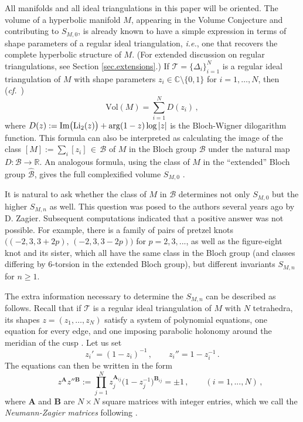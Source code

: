 \documentclass[12pt]{amsart}
\newcommand{\lbl}{\label}
\theoremstyle{definition}
\def\BR{\mathbb R}
\def\BC{\mathbb C}
\def\be{  \begin{equation} }
\def\ee{  \end{equation} }
\newcommand{\CT}{\mathcal{T}}
\newcommand{\Li}{{\rm Li}}
\newcommand{\ie}{\emph{i.e.}}
\newcommand{\cf}{\emph{cf.}}
\newcommand{\mb}{\mathbf}
\numberwithin{equation}{section}
\begin{document}
All manifolds and all ideal triangulations in this paper will be 
oriented. 
The volume of a hyperbolic manifold $M$, appearing in the Volume
Conjecture and contributing to $S_{M,0}$, is already known to have a simple 
expression in terms of shape parameters of a regular ideal 
triangulation, \ie, one that recovers the complete hyperbolic structure of 
$M$. (For extended discussion on regular triangulations, see Section \ref{sec.extensions}.)
If $\CT=\{\Delta_i\}_{i=1}^N$ is a regular ideal triangulation of $M$
with shape parameters 
$z_i \in \BC\setminus\{0,1\}$ for $i=1,\dots,N$, then (\cf\ \cite{DuS, NZ})
%
\be \mathrm{Vol}(M) 
= \sum_{i=1}^N D(z_i)\,,
\lbl{eq.Dz}
\ee
%
where $D(z) := \mathrm{Im}\big(\Li_2(z)\big)+\arg(1-z)\log|z|$ is the Bloch-Wigner dilogarithm function.
This formula can also be interpreted as calculating the image of the class 
$[M]:=\sum_i[z_i]\,\in\,\mathcal{B}$ of $M$ in the 
Bloch group $\mathcal{B}$ under the natural map $D:\mathcal{B} \to \BR$. 
An analogous formula, using the class of $M$ in the ``extended'' Bloch group 
$\widehat{\mathcal{B}}$, gives the full complexified volume $S_{M,0}$ 
\cite{Neumann-combi, N,GoZi, Zickert-rep}. 

It is natural to ask whether the class of $M$ in $\mathcal{B}$
determines not only $S_{M,0}$ but the higher $S_{M,n}$ as well. 
This question was posed to the authors several years ago by D. Zagier.
Subsequent computations \cite{GZ,Ga2} indicated that a positive answer
was not possible. For example, there is a family of pairs of pretzel knots 
$\big((-2,3,3+2p),\,(-2,3,3-2p)\big)$ for $p=2,3,...$, as well as the figure-eight knot and its sister, which all have the same class 
in the Bloch group (and classes differing by 6-torsion in the extended
Bloch group), but different invariants $S_{M,n}$ for $n \geq 1$. 

The extra information necessary to determine the $S_{M,n}$ can be described as follows.
Recall that if $\CT$ %
is a regular ideal triangulation of $M$ with $N$ tetrahedra, its shapes $z=(z_1,\dots,z_N)$ satisfy a system of 
polynomial equations, one equation for every 
edge, and one imposing 
parabolic holonomy around the meridian of the cusp \cite{Th, NZ}. Let us set
%
\be z_i' = (1-z_i)^{-1}\,,\qquad z_i''=1-z_i^{-1}\,.\ee
%
The equations can then be written in the form
%
\be \qquad
z^{\mb A} z''{}^{\mb B} :=
\prod_{j=1}^N z_j^{\mb A_{ij}}\big(1-z_j^{-1}\big)^{\mb B_{ij}}=\pm 1\,,
\qquad (i=1,...,N)\,, \lbl{NZintro} \ee
%
where $\mb A$ and $\mb B$ are $N\times N$ square matrices with integer 
entries, which we call the \emph{Neumann-Zagier matrices} following \cite{NZ}. 
\end{document}

